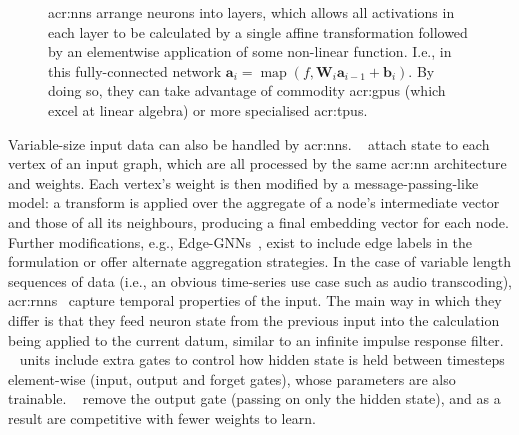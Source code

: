\begin{figure}
	\centering
	\resizebox{0.9\linewidth}{!}{}
	\caption[An example fully-connected neural network.]{\glspl{acr:nn} arrange neurons into layers, which allows all activations in each layer to be calculated by a single affine transformation followed by an elementwise application of some non-linear function. I.e., in this fully-connected network $\mathbf{a}_{i} = \operatorname{map}\left(f, \mathbf{W}_i\mathbf{a}_{i-1} + \mathbf{b}_i\right)$. By doing so, they can take advantage of commodity \glspl{acr:gpu} (which excel at linear algebra) or more specialised \glspl{acr:tpu}.}\label{fig:fcnn}
\end{figure}


Variable-size input data can also be handled by \glspl{acr:nn}.
~\parencite{DBLP:conf/iclr/KipfW17} attach state to each vertex of an input graph, which are all processed by the same \gls{acr:nn} architecture and weights.
Each vertex's weight is then modified by a message-passing-like model: a transform is applied over the aggregate of a node's intermediate vector and those of all its neighbours, producing a final embedding vector for each node.
Further modifications, e.g., Edge-GNNs~\parencite{Mirhoseini2021}, exist to include edge labels in the formulation or offer alternate aggregation strategies.
In the case of variable length sequences of data (i.e., an obvious time-series use case such as audio transcoding), \glspl{acr:rnn}~\parencite{Rumelhart1986} capture temporal properties of the input.
The main way in which they differ is that they feed neuron state from the previous input into the calculation being applied to the current datum, similar to an infinite impulse response filter.
~\parencite{DBLP:journals/neco/HochreiterS97} units include extra gates to control how hidden state is held between timesteps element-wise (input, output and forget gates), whose parameters are also trainable.
~\parencite{DBLP:conf/emnlp/ChoMGBBSB14} remove the output gate (passing on only the hidden state), and as a result are competitive with fewer weights to learn.

